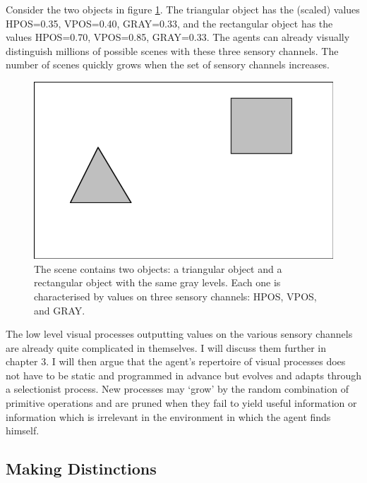 Consider the two objects in figure \ref{scene1-1}. The triangular
object has the (scaled) values HPOS=0.35, VPOS=0.40, GRAY=0.33, and 
the rectangular object has the values HPOS=0.70, VPOS=0.85, 
GRAY=0.33. The agents can already visually distinguish
millions of possible scenes with these three sensory
channels. The number of scenes
quickly grows when the set of sensory channels increases. 
\begin{figure}[htbp]
  \centerline{\includegraphics[width=.50\textwidth]{chap2/figs/scene1-1}}
\caption{\small\label{scene1-1} The scene contains two 
objects: a triangular object and a rectangular object
with the same gray levels. 
Each one is characterised by values on three sensory 
channels: HPOS, VPOS, and GRAY.}
\end{figure}

The low level visual processes outputting
values on the various sensory channels are already quite
complicated in themselves. I will discuss them further in 
chapter 3. I will then argue that the 
agent's repertoire of visual processes does not have to be
static and programmed in advance but evolves and adapts
through a selectionist process. New processes may `grow'
by the random combination of primitive operations and are
pruned when they fail to yield useful information or information 
which is irrelevant in the environment in which the agent 
finds himself. 

\subsection{Making Distinctions}

